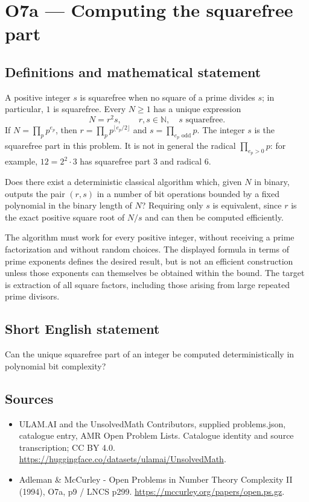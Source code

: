 \documentclass[11pt,a4paper]{article}
\begin{document}
\section*{O7a — Computing the squarefree part}\label{statement}

\subsection{Definitions and mathematical statement}
A positive integer $s$ is squarefree when no square of a prime divides $s$; in particular, $1$ is squarefree. Every $N\ge1$ has a unique expression
\[
N=r^2s,\qquad r,s\in\mathbb N,\quad s\text{ squarefree}.
\]
If $N=\prod_p p^{e_p}$, then $r=\prod_p p^{\lfloor e_p/2\rfloor}$ and $s=\prod_{e_p\text{ odd}}p$. The integer $s$ is the squarefree part in this problem. It is not in general the radical $\prod_{e_p>0}p$: for example, $12=2^2\cdot3$ has squarefree part $3$ and radical $6$.

Does there exist a deterministic classical algorithm which, given $N$ in binary, outputs the pair $(r,s)$ in a number of bit operations bounded by a fixed polynomial in the binary length of $N$? Requiring only $s$ is equivalent, since $r$ is the exact positive square root of $N/s$ and can then be computed efficiently.

The algorithm must work for every positive integer, without receiving a prime factorization and without random choices. The displayed formula in terms of prime exponents defines the desired result, but is not an efficient construction unless those exponents can themselves be obtained within the bound. The target is extraction of all square factors, including those arising from large repeated prime divisors.
\subsection{Short English statement}
Can the unique squarefree part of an integer be computed deterministically in polynomial bit complexity?
\subsection{Sources}
\begin{itemize}
\item[S1] ULAM.AI and the UnsolvedMath Contributors, supplied problems.json, catalogue entry, AMR Open Problem Lists. Catalogue identity and source transcription; CC BY 4.0.
\url{https://huggingface.co/datasets/ulamai/UnsolvedMath}.
\item[S2] Adleman \& McCurley - Open Problems in Number Theory Complexity II (1994), O7a, p9 / LNCS p299. 
\url{https://mccurley.org/papers/open.ps.gz}.
\end{itemize}
\end{document}
